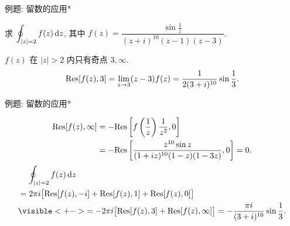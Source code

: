 %


\begin{frame}{例题: 留数的应用*}
\begin{example}
求 $\displaystyle\oint_{|z|=2}f(z)\,\mathrm{d} z$, 其中 $f(z)=\dfrac{\sin\frac1z}{(z+i)^{10}(z-1)(z-3)}$.
\end{example}
\begin{solution}
$f(z)$ 在 $|z|>2$ 内只有奇点 $3,\infty$.
\onslide<+->
\[{\mathrm{Res}}[f(z),3]=\lim_{z\to3}(z-3)f(z)=\frac1{2(3+i)^{10}}\sin\frac13.\]
\end{solution}
\end{frame}


\begin{frame}{例题: 留数的应用*}
\begin{solutionc}
\begin{align*}
{\mathrm{Res}}[f(z),\infty]&=-{\mathrm{Res}}\left[f\left(\frac1z\right)\frac1{z^2},0\right]\\
&=-{\mathrm{Res}}\left[\frac{z^{10}\sin z}{(1+iz)^{10}(1-z)(1-3z)},0\right]=0.
\end{align*}
\vspace{-\baselineskip}
\onslide<+->
\begin{align*}
&\peq\oint_{|z|=2}f(z)\diff z\\
&=2\pi i\bigl[\Res[f(z),-i]+\Res[f(z),1]+\Res[f(z),0]\bigr]\\
&\visible<+->{=-2\pi i\bigl[\Res[f(z),3]+\Res[f(z),\infty]\bigr]=-\frac{\pi i}{(3+i)^{10}}\sin\frac13.}
\end{align*}
\end{solutionc}
\end{frame}


